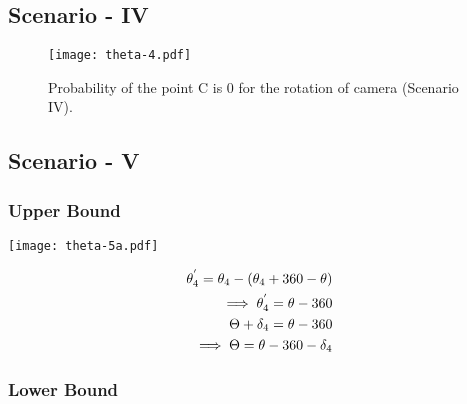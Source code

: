 \subsection{Scenario - IV}

\begin{figure}[H]
	\centering
	\texttt{[image: theta-4.pdf]} 
	\caption{Probability of the point C is $0$ for the rotation of camera (Scenario IV).}
	\label{fig:SWIM-images}
\end{figure}



\subsection{Scenario - V}

\subsubsection{Upper Bound}

\begin{minipage}[t]{0.5\textwidth}
\texttt{[image: theta-5a.pdf]} 
\end{minipage}
\begin{minipage}[t]{0.5\textwidth}
\vspace{-1in}
\begin{equation*}
\centering
\begin{aligned}
\theta_4^{'} = \theta_4 - (\theta_4 + 360 -\theta)\\
\implies \theta_4^{'} = \theta - 360 \\
\Theta + \delta_4 = \theta - 360 \\
\implies \Theta = \theta - 360 - \delta_4
\end{aligned}
\end{equation*}
\end{minipage}







\subsubsection{Lower Bound}

